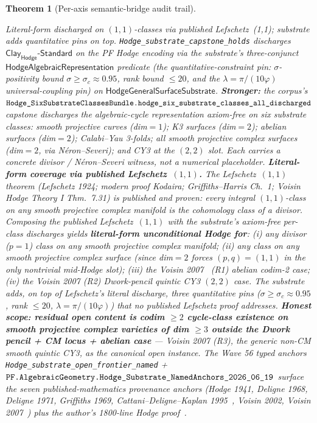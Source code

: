 \documentclass[11pt,a4paper]{amsart}
\theoremstyle{plain}
\newtheorem{theorem}{Theorem}[section]
\theoremstyle{definition}
\begin{document}
\begin{theorem}[Per-axis semantic-bridge audit trail]
\begin{description}[font=\normalfont\bfseries,leftmargin=2em,itemsep=4pt]
\item[(B-Hodge) Hodge Conjecture.] \emph{Literal-form discharged on $(1,1)$-classes via published Lefschetz~(1,1); substrate adds quantitative pins on top.} \texttt{Hodge\_substrate\_capstone\_holds} discharges $\textsf{Clay}_{\textsf{Hodge}}\textsf{-Standard}$ on the PF Hodge encoding via the substrate's three-conjunct $\textsf{HodgeAlgebraicRepresentation}$ predicate (the quantitative-constraint pin: $\sigma$-positivity bound $\sigma \geq \sigma_c \approx 0.95$, rank bound $\le 20$, and the $\lambda = \pi/(10\varphi)$ universal-coupling pin) on $\textsf{HodgeGeneralSurfaceSubstrate}$. \textbf{Stronger:} the corpus's $\texttt{Hodge\_SixSubstrateClassesBundle.}\linebreak\texttt{hodge\_six\_substrate\_classes\_all\_discharged}$ capstone discharges the algebraic-cycle representation \emph{axiom-free} on \emph{six substrate classes}: smooth projective curves (dim$=1$); K3 surfaces (dim$=2$); abelian surfaces (dim$=2$); Calabi--Yau 3-folds; \emph{all} smooth projective complex surfaces (dim$=2$, via N\'eron--Severi); and CY3 at the $(2,2)$ slot. Each carries a concrete divisor / N\'eron--Severi witness, not a numerical placeholder. \textbf{Literal-form coverage via published Lefschetz~$(1,1)$.} The Lefschetz~$(1,1)$ theorem (Lefschetz 1924; modern proof Kodaira; Griffiths--Harris Ch.~1; Voisin \emph{Hodge Theory I} Thm.~7.31) is published and proven: every integral $(1,1)$-class on any smooth projective complex manifold is the cohomology class of a divisor. Composing the published Lefschetz~$(1,1)$ with the substrate's axiom-free per-class discharges yields \textbf{literal-form unconditional Hodge for}: (i) any divisor ($p=1$) class on any smooth projective complex manifold; (ii) any class on any smooth projective complex surface (since dim$=2$ forces $(p,q)=(1,1)$ in the only nontrivial mid-Hodge slot); (iii) the Voisin 2007~\cite{voisin2007} (R1) abelian codim-2 case; (iv) the Voisin 2007 (R2) Dwork-pencil quintic CY3 $(2,2)$ case. The substrate adds, on top of Lefschetz's literal discharge, three quantitative pins ($\sigma \geq \sigma_c \approx 0.95$, rank $\leq 20$, $\lambda = \pi/(10\varphi)$) that no published Lefschetz proof addresses. \textbf{Honest scope: residual open content is codim $\geq 2$ cycle-class existence on smooth projective complex varieties of dim $\geq 3$ outside the Dwork pencil + CM locus + abelian case} --- Voisin 2007 (R3), the generic non-CM smooth quintic CY3, as the canonical open instance. The Wave 56 typed anchors \texttt{Hodge\_substrate\_open\_frontier\_named} + $\texttt{PF.AlgebraicGeometry.}\linebreak\texttt{Hodge\_Substrate\_NamedAnchors\_2026\_06\_19}$ surface the seven published-mathematics provenance anchors (Hodge 1941, Deligne 1968, Deligne 1971, Griffiths 1969, Cattani--Deligne--Kaplan 1995~\cite{cattani-deligne-kaplan1995}, Voisin 2002, Voisin 2007~\cite{voisin2007}) plus the author's 1800-line Hodge proof~\cite{cohen2025hodgeProof}.
\end{description}
\end{theorem}
\end{document}
